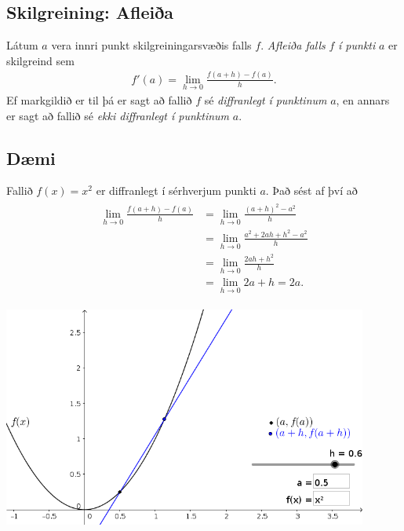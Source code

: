\documentclass[a4paper,10pt,icelandic]{sphinxmanual}
\begin{document}
\subsection{Skilgreining: Afleiða}
\label{kafli03:skilgreining-afleia}
Látum \(a\) vera innri punkt skilgreiningarsvæðis falls \(f\).
\textit{Afleiða falls} \(f\) \emph{í punkti} \(a\) er skilgreind sem
\begin{equation*}
\begin{split}f'(a)=\lim_{h\rightarrow 0}\frac{f(a+h)-f(a)}{h}.\end{split}
\end{equation*}
Ef markgildið er til þá er sagt að fallið \(f\) sé
\textit{diffranlegt} \emph{í
punktinum} \(a\), en annars er sagt að fallið sé \emph{ekki diffranlegt í
punktinum} \(a\).


\subsection{Dæmi}
\label{kafli03:daemi}
Fallið \(f(x) = x^2\) er diffranlegt í sérhverjum punkti \(a\).
Það sést af því að
\begin{equation*}
\begin{split}\begin{aligned}
\lim_{h\to 0} \frac{f(a+h)-f(a)}{h}
&= \lim_{h\to 0} \frac{(a+h)^2-a^2}{h}\\
&= \lim_{h\to 0} \frac{a^2+2ah+h^2-a^2}{h}\\
&= \lim_{h\to 0} \frac{2ah+h^2}{h}\\
&= \lim_{h\to 0} 2a+h = 2a.\end{aligned}\end{split}
\end{equation*}

\begin{center}
\includegraphics[width=12cm,keepaspectratio=true]{./01_afleida.png}
\end{center}
\end{document}
